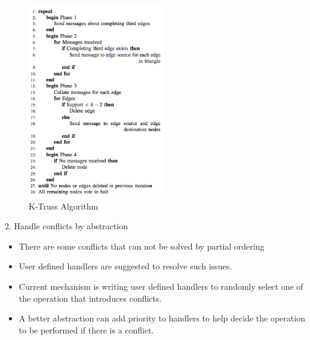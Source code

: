 \begin{frame}
 \begin{figure}
		\includegraphics[width=6cm, height=5 cm, angle=0]{figures/example.jpg}
		\caption{K-Truss Algorithm }
\end{figure}
		\let\thefootnote\relax{}
\end{frame}

\begin{frame}	

2. Handle conflicts by abstraction
		      \linebreak
		   	  \begin{itemize}
				\item There are some conflicts that can not be solved by partial ordering 
				\item User defined handlers are suggested to resolve such issues.
				\item Current mechanism is writing user defined handlers to randomly select one of the operation that introduces conflicts.
				\item A better abstraction can add priority to handlers to help decide the operation to be performed if there is a conflict.
		     	  \end{itemize}

\end{frame}


